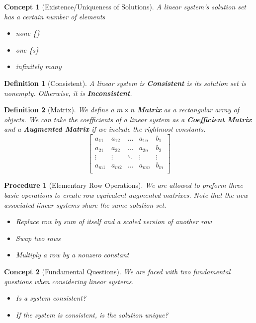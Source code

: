 \documentclass[12pt]{report}
\newtheorem{dfn}{Definition}
\newtheorem{cpt}{Concept}
\newtheorem{proc}{Procedure}
\begin{document}
\begin{cpt}[Existence/Uniqueness of Solutions]
A linear system's solution set has a certain number of elements
\begin{itemize}
\item none \{\}
\item one \{s\}
\item infinitely many
\end{itemize}
\end{cpt}

\begin{dfn}[Consistent]
A linear system is \textbf{Consistent} is its solution set is nonempty. Otherwise, it is \textbf{Inconsistent}.
\end{dfn}

\begin{dfn}[Matrix]
We define a $m\times n$ \textbf{Matrix} as a rectangular array of objects. We can take the coefficients of a linear system as a \textbf{Coefficient Matrix} and a \textbf{Augmented Matrix} if we include the rightmost constants.
\begin{equation}
\begin{bmatrix}
	a_{11} & a_{12} & \ldots & a_{1n} & b_1 \\
	a_{21} & a_{22} & \ldots & a_{2n} & b_2 \\
	\vdots & \vdots & \ddots & \vdots & \vdots \\
	a_{m1} & a_{m2} & \ldots & a_{mn} & b_m \\
\end{bmatrix}
\end{equation}
\end{dfn}

\begin{proc}[Elementary Row Operations]

We are allowed to preform three basic operations to create row equivalent augmented matrixes. Note that the new associated linear systems share the same solution set.

\begin{itemize}
\item[Replacement] Replace row by sum of itself and a scaled version of another row
\item[Interchange] Swap two rows
\item[Scaling] Multiply a row by a nonzero constant
\end{itemize}
\end{proc}

\begin{cpt}[Fundamental Questions]
We are faced with two fundamental questions when considering linear systems.

\begin{itemize}
\item Is a system consistent?
\item If the system is consistent, is the solution unique?
\end{itemize}
\end{cpt}
\end{document}
